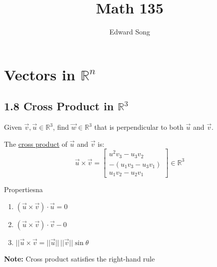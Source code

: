 \documentclass[11pt]{article}
\title{Math 135}
\author{Edward Song}
\theoremstyle{plain}
\theoremstyle{remark}
\theoremstyle{plain}
\newcommand{\bd}{\textbf}
\newcommand{\rn}{\mathbb{R}}
\begin{document}
\section{Vectors in $\rn^n$}


   


\subsection*{1.8 Cross Product in $\rn^3$}
\begin{tcolorbox}[colback=magenta!5!white,colframe=magenta!75!black,title=Example]
   Given $\overrightarrow{v}, \overrightarrow{u}\in\rn^3$, find $\overrightarrow{w}\in\rn^3$ that is
   perpendicular to both $\overrightarrow{u}$ and $\overrightarrow{v}$.
\end{tcolorbox}   

\begin{tcolorbox}[colback=green!5!white,colframe=green!75!black,title=Definition]
    The \underline{cross product} of $\overrightarrow{u}$ and $\overrightarrow{v}$ is:
    \[\overrightarrow{u}\times\overrightarrow{v} = \begin{bmatrix}
        u^2v_3-u_3v_2 \\
        - (u_1v_3-u_3v_1) \\
        u_1v_2-u_2v_1
    \end{bmatrix} \in \rn^3\]
 \end{tcolorbox}   

 \begin{theo}{Properties}{na}
    \begin{enumerate}
        \item $(\overrightarrow{u}\times\overrightarrow{v})\cdot\overrightarrow{u} = 0$ 
        \item $(\overrightarrow{u}\times\overrightarrow{v})\cdot\overrightarrow{v} - 0$
        \item $||\overrightarrow{u}\times\overrightarrow{v} = ||\overrightarrow{u}||\,||\overrightarrow{v}||\sin\theta$
    \end{enumerate}
 \end{theo}

 \bd{Note:} Cross product satisfies the right-hand rule
\end{document}
